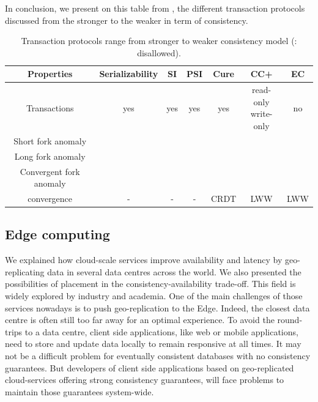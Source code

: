 \documentclass[11pt]{article}
\newcommand{\xmark}{\ding{55}}%
\begin{document}
In conclusion, we present on this table from \cite{Cure2016}, the different
transaction protocols discussed from the stronger to the weaker in term of
consistency.

\begin{table}[H]
	\centering
	\begin{tabular}{ |c|cccccc| } 
		\hline
		\textbf{Properties} & Serializability & SI & PSI & Cure & CC+ & EC \\
		\hline
		Transactions & yes & yes & yes & yes & \makecell{read-only\\write-only} & no\\
		\hline 
		Short fork anomaly & \xmark & \checkmark & \checkmark & \checkmark &  \checkmark &  \checkmark\\ 
		Long fork anomaly & \xmark & \xmark &  \checkmark &  \checkmark &  \checkmark &  \checkmark \\
		Convergent fork anomaly & \xmark & \xmark & \xmark & \checkmark & \checkmark & \checkmark \\
		\hline
		convergence & - & - & - & CRDT & LWW & LWW\\
		\hline
	\end{tabular}
	\caption{Transaction protocols range from stronger to weaker consistency model (\xmark: disallowed).}
	\label{table:1}
\end{table}

\subsection{Edge computing}

We explained how cloud-scale services improve availability and latency by
geo-replicating data in several data centres across the world. We also
presented the possibilities of placement in the consistency-availability
trade-off. This field is widely explored by industry and academia. One of the
main challenges of those services nowadays is to push geo-replication to the
Edge. Indeed, the closest data centre is often still too far away for an
optimal experience. To avoid the round-trips to a data centre, client side
applications, like web or mobile applications, need to store and update data
locally to remain responsive at all times. It may not be a difficult problem
for eventually consistent databases with no consistency guarantees. But
developers of client side applications based on geo-replicated cloud-services
offering strong consistency guarantees, will face problems to maintain those
guarantees system-wide.
\end{document}
